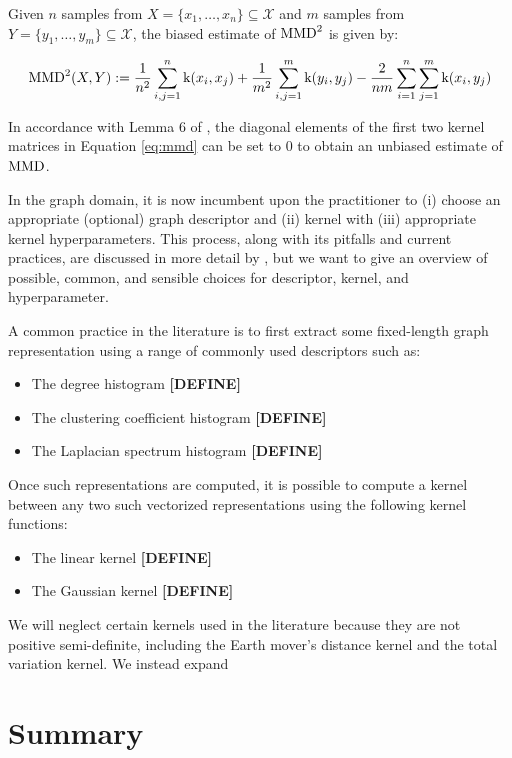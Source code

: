 Given $n$ samples from $X=\{x_1,\dots, x_n\}\subseteq\mathcal{X}$ and $m$
samples from $Y=\{y_1,\dots, y_m\}\subseteq\mathcal{X}$, the biased estimate of $\text{MMD}^2$ is given by:

\begin{equation}
  \label{eq:mmd}
  \text{MMD}^2(X,Y) := {1\over n^2}\sum_{i,j=1}^n\text{k}(x_i, x_j) + {1\over m^2}\sum_{i,j=1}^m\text{k}(y_i,y_j) - {2\over nm}\sum_{i=1}^{n}\sum_{j=1}^{m}\text{k} (x_i,y_j)
\end{equation}

In accordance with Lemma 6 of \cite{gretton2012kernel}, the diagonal elements of
the first two kernel matrices in Equation \ref{eq:mmd} can be set to $0$ to
obtain an unbiased estimate of $\text{MMD}$.

In the graph domain, it is now incumbent upon the practitioner to (i) choose an
appropriate (optional) graph descriptor and (ii) kernel with (iii) appropriate
kernel hyperparameters. This process, along with its pitfalls and current
practices, are discussed in more detail by \cite{o2021evaluation}, but we want
to give an overview of possible, common, and sensible choices for descriptor,
kernel, and hyperparameter.

A common practice in the literature is to first extract some fixed-length graph
representation using a range of commonly used descriptors such as:
\begin{itemize}
\item The degree histogram \textbf{[DEFINE]}
\item The clustering coefficient histogram \textbf{[DEFINE]}
\item The Laplacian spectrum histogram \textbf{[DEFINE]}
\end{itemize}

Once such representations are computed, it is possible to compute a kernel
between any two such vectorized representations using the following kernel
functions:

\begin{itemize}
\item The linear kernel \textbf{[DEFINE]}
\item The Gaussian kernel \textbf{[DEFINE]}
\end{itemize}

We will neglect certain kernels used in the literature because they are not
positive semi-definite, including the Earth mover's distance kernel and the
total variation kernel. We instead expand


\section{Summary}
